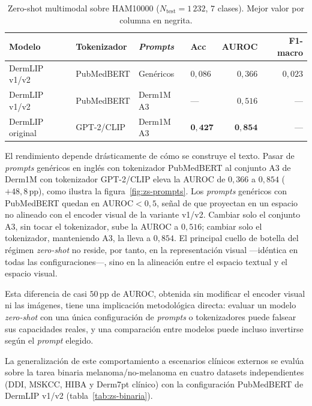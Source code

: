 \begin{table}[H]
\centering
\footnotesize
\setlength{\tabcolsep}{4pt}
\renewcommand{\arraystretch}{0.95}
\caption{Zero-shot multimodal sobre HAM10000 ($N_{\mathrm{test}} = 1\,232$,
$7$ clases). Mejor valor por columna en negrita.}
\label{tab:zs-ham}
\begin{tabular}{llllrr}
\hline
Modelo                    & Tokenizador  & \emph{Prompts}     & Acc       & AUROC     & F1-macro \\
\hline
DermLIP v1/v2             & PubMedBERT   & Genéricos          & $0{,}086$ & $0{,}366$ & $0{,}023$ \\
DermLIP v1/v2             & PubMedBERT   & Derm1M A3          & ---       & $0{,}516$ & --- \\
DermLIP original          & GPT-2/CLIP   & Derm1M A3          & $\mathbf{0{,}427}$ & $\mathbf{0{,}854}$ & --- \\
\hline
\end{tabular}
\end{table}

El rendimiento depende drásticamente de cómo se construye el texto.
Pasar de \emph{prompts} genéricos en inglés con tokenizador
PubMedBERT al conjunto A3 de Derm1M con tokenizador GPT-2/CLIP eleva
la AUROC de $0{,}366$ a $0{,}854$ ($+48{,}8$\,pp), como ilustra la
figura~\ref{fig:zs-prompts}. Los
\emph{prompts} genéricos con PubMedBERT quedan en AUROC$<0{,}5$,
señal de que proyectan en un espacio no alineado con el encoder
visual de la variante v1/v2. Cambiar solo el conjunto A3, sin tocar
el tokenizador, sube la AUROC a $0{,}516$; cambiar solo el
tokenizador, manteniendo A3, la lleva a $0{,}854$. El principal cuello
de botella del régimen \emph{zero-shot} no reside, por tanto, en la
representación visual ---idéntica en todas las configuraciones---,
sino en la alineación entre el espacio textual y el espacio visual.

Esta diferencia de casi $50$\,pp de AUROC, obtenida sin modificar el
encoder visual ni las imágenes, tiene una implicación metodológica
directa: evaluar un modelo \emph{zero-shot} con una única configuración
de \emph{prompts} o tokenizadores puede falsear sus capacidades
reales, y una comparación entre modelos puede incluso invertirse según
el \emph{prompt} elegido.

La generalización de este comportamiento a escenarios clínicos
externos se evalúa sobre la tarea binaria melanoma/no-melanoma en
cuatro datasets independientes
(DDI, MSKCC, HIBA y Derm7pt clínico) con la configuración
PubMedBERT de DermLIP v1/v2 (tabla~\ref{tab:zs-binaria}).

